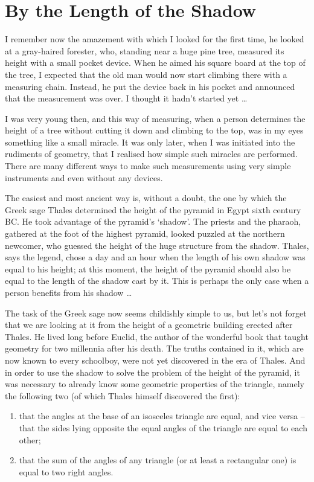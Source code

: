 \section{By the Length of the Shadow}
\label{sec-1.1}

I remember now the amazement with which I looked for the first time, he looked at a gray-haired forester, who, standing near a huge pine tree, measured its height with a small pocket device. When he aimed his square board at the top of the tree, I expected that the old man would now start climbing there with a measuring chain. Instead, he put the device back in his pocket and announced that the measurement was over. I thought it hadn't started yet \ldots{}

I was very young then, and this way of measuring, when a person determines the height of a tree without cutting it down and climbing to the top, was in my eyes something like a small miracle. It was only later, when I was initiated into the rudiments of geometry, that I realised how simple such miracles are performed. There are many different ways to make such measurements using very simple instruments and even without any devices.

The easiest and most ancient way is, without a doubt, the one by which the Greek sage Thales determined the height of the pyramid in Egypt sixth century BC. He took advantage of the pyramid's `shadow'. The priests and the pharaoh, gathered at the foot of the highest pyramid, looked puzzled at the northern newcomer, who guessed the height of the huge structure from the shadow. Thales, says the legend, chose a day and an hour when the length of his own shadow was equal to his height; at this moment, the height of the pyramid should also be equal to the length of the shadow cast by it. This is perhaps the only case when a person benefits from his shadow \ldots{}

The task of the Greek sage now seems childishly simple to us, but let's not forget that we are looking at it from the height of a geometric building erected after Thales. He lived long before Euclid, the author of the wonderful book that taught geometry for two millennia after his death. The truths contained in it, which are now known to every schoolboy, were not yet discovered in the era of Thales. And in order to use the shadow to solve the problem of the height of the pyramid, it was necessary to already know some geometric properties of the triangle, namely the following two (of which Thales himself discovered the first):
\begin{enumerate}
\item that the angles at the base of an isosceles triangle are equal, and vice versa -- that the sides lying opposite the equal angles of the triangle are equal to each other;
\item that the sum of the angles of any triangle (or at least a rectangular one) is equal to two right angles.
\end{enumerate}

